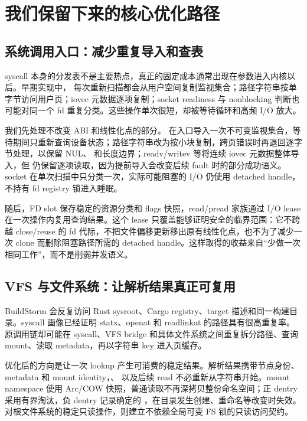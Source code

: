 \chapter{我们保留下来的核心优化路径}

\section{系统调用入口：减少重复导入和查表}

syscall 本身的分发表不是主要热点，真正的固定成本通常出现在参数进入内核以后。早期实现中， 每次重新扫描都会从用户空间复制监视集合；路径字符串按单字节访问用户页；iovec 元数据逐项复制；socket readiness 与 nonblocking 判断也可能对同一个 fd 重复分类。这些操作单次很短，却被等待循环和高频 I/O 放大。

我们先处理不改变 ABI 和线性化点的部分。 在入口导入一次不可变监视集合，等待期间只重新查询设备状态；路径字符串改为按小块复制，跨页错误时再退回逐字节处理，以保留 NUL、 和长度边界；readv/writev 等将连续 iovec 元数据整体导入，但  仍保留逐项读取，因为提前导入会改变后续 fault 时的部分成功语义。socket 在单次扫描中只分类一次，实际可能阻塞的 I/O 仍使用 detached handle，不持有 fd registry 锁进入睡眠。

随后，FD slot 保存稳定的资源分类和 flags 快照，read/pread 家族通过 I/O lease 在一次操作内复用查询结果。这个 lease 只覆盖能够证明安全的临界范围：它不跨越 close/reuse 的 fd 代际，不把文件偏移更新移出原有线性化点，也不为了减少一次 clone 而删除阻塞路径所需的 detached handle。这样取得的收益来自“少做一次相同工作”，而不是削弱并发语义。

\section{VFS 与文件系统：让解析结果真正可复用}

BuildStorm 会反复访问 Rust sysroot、Cargo registry、target 描述和同一构建目录。syscall 画像已经证明 statx、openat 和 readlinkat 的路径具有很高重复率。原调用链却可能在 syscall、VFS bridge 和具体文件系统之间重复拆分路径、查询 mount、读取 metadata，再以字符串 key 进入页缓存。

优化后的方向是让一次 lookup 产生可消费的稳定结果。解析结果携带节点身份、metadata 和 mount identity，、 以及后续 read 不必重新从字符串开始。mount namespace 使用 Arc/COW 快照，普通读取不再深拷贝整份命名空间；正 dentry 采用有界淘汰，负 dentry 记录确定的 ，在目录发生创建、重命名等改变时失效。对根文件系统的稳定只读操作，则建立不依赖全局可变 FS 锁的只读访问契约。

